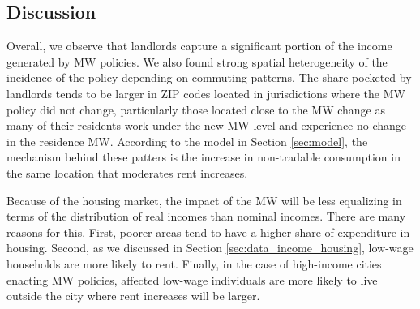 \subsection{Discussion}\label{sec:discussion_cf}

Overall, we observe that landlords capture a significant portion of the income 
generated by MW policies.
We also found strong spatial heterogeneity of the incidence of the policy 
depending on commuting patterns.
The share pocketed by landlords tends to be larger in ZIP codes located in 
jurisdictions where the MW policy did not change,
particularly those located close to the MW change as many of their residents
work under the new MW level and experience no change in the residence MW.
According to the model in Section \ref{sec:model}, the mechanism behind
these patters is the increase in non-tradable consumption in the same location
that moderates rent increases.

Because of the housing market, 
the impact of the MW will be less equalizing in terms of the distribution of
real incomes than nominal incomes.
There are many reasons for this.
First, poorer areas tend to have a higher share of expenditure in housing.
Second, as we discussed in Section \ref{sec:data_income_housing},
low-wage households are more likely to rent.
Finally, in the case of high-income cities enacting MW policies, affected 
low-wage individuals are more likely to live outside the city where rent
increases will be larger.
